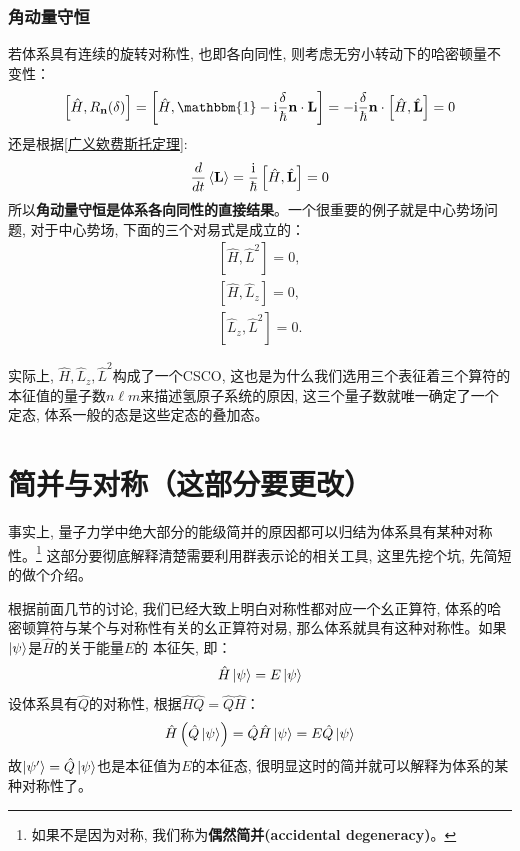 \documentclass[a4paper,zihao=-4,linespread=1]{ctexrep}
\begin{document}
    \subsubsection*{角动量守恒}
    若体系具有连续的旋转对称性, 也即各向同性, 则考虑无穷小转动下的哈密顿量不变性：
    \begin{equation}
        \left[\hat{H},R_{\mathbf{n}}(\delta)\right]=\left[\hat H,\mathbbm{1}-\mathrm{i}\frac{\delta }{\hbar}\mathbf{n}\cdot\mathbf{L}\right]=-\mathrm i\frac{\delta}{\hbar}\mathbf{n}\cdot\left[\hat{H},\hat{\mathbf{L}}\right]=0
    \end{equation}
    还是根据\ref{广义欸费斯托定理}:
    \begin{equation}
        \frac{d}{dt}\braket{\mathbf{L}}=\frac{\mathrm i}{\hbar}\left[\hat{H},\hat{\mathbf{L}}\right]=0
    \end{equation}
    所以\textbf{角动量守恒是体系各向同性的直接结果}。一个很重要的例子就是中心势场问题, 对于中心势场, 下面的三个对易式是成立的：
    \begin{equation*}
        \begin{array}{l}
        {\left[\hat{H}, \hat{L}^{2}\right]=0,} \\
        {\left[\hat{H}, \hat{L}_{z}\right]=0,} \\
        {\left[\hat{L}_{z}, \hat{L}^{2}\right]=0.}
        \end{array}
    \end{equation*}
    
    实际上, $\hat{H},\hat{L}_z, \hat{L}^2$构成了一个CSCO, 这也是为什么我们选用三个表征着三个算符的本征值的量子数$n\ell m $来描述氢原子系统的原因, 这三个量子数就唯一确定了一个定态, 
    体系一般的态是这些定态的叠加态。

    \section{简并与对称（这部分要更改）}
    事实上, 量子力学中绝大部分的能级简并的原因都可以归结为体系具有某种对称性。\footnote{如果不是因为对称, 我们称为\textbf{偶然简并(accidental degeneracy)}。}
    这部分要彻底解释清楚需要利用群表示论的相关工具, 这里先挖个坑, 先简短的做个介绍。

    根据前面几节的讨论, 我们已经大致上明白对称性都对应一个幺正算符, 体系的哈密顿算符与某个与对称性有关的幺正算符对易, 那么体系就具有这种对称性。如果$\ket{\psi}$是$\hat{H}$的关于能量$E$的
    本征矢, 即：
    \[\hat{H}\ket{\psi}=E\ket{\psi}\]
    设体系具有$\hat{Q}$的对称性, 根据$\hat{H}\hat{Q}=\hat{Q}\hat{H}$：
    \begin{equation}
        \label{eq:6.46}
        \hat{H}\left(\hat{Q}\ket{\psi}\right)=\hat{Q}\hat{H}\ket{\psi}=E\hat{Q}\ket{\psi}
    \end{equation}
    故$\ket{\psi^\prime}=\hat{Q}\ket{\psi}$也是本征值为$E$的本征态, 很明显这时的简并就可以解释为体系的某种对称性了。
\end{document}

